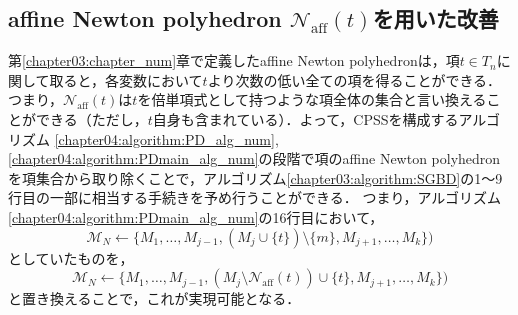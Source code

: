 \subsection{affine Newton polyhedron $\mathcal{N}_{\mathrm{aff}}(t)$を用いた改善}
\label{chapter04:subsection:section_num}
第\ref{chapter03:chapter_num}章で定義したaffine Newton polyhedronは，項$t \in T_n$に関して取ると，各変数において$t$より次数の低い全ての項を得ることができる．つまり，$\mathcal{N}_{\mathrm{aff}}(t)$は$t$を倍単項式として持つような項全体の集合と言い換えることができる（ただし，$t$自身も含まれている）．よって，CPSSを構成するアルゴリズム \ref{chapter04:algorithm:PD_alg_num}, \ref{chapter04:algorithm:PDmain_alg_num}の段階で項のaffine Newton polyhedronを項集合から取り除くことで，アルゴリズム\ref{chapter03:algorithm:SGBD}の1〜9行目の一部に相当する手続きを予め行うことができる．
つまり，アルゴリズム\ref{chapter04:algorithm:PDmain_alg_num}の16行目において，
$$\mathcal{M}_N \gets \{ M_1, \dots, M_{j-1}, (M_j \cup \{ t \}) \setminus \{ m \}, M_{j+1}, \dots, M_k \})$$
としていたものを，
$$\mathcal{M}_N \gets \{ M_1, \dots, M_{j-1}, (M_j \setminus \mathcal{N}_{\mathrm{aff}}(t))\cup \{ t \}, M_{j+1}, \dots, M_k \})$$
と置き換えることで，これが実現可能となる．

